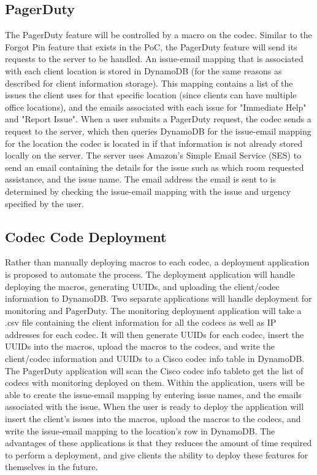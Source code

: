 \documentclass[letterpaper,12pt]{article}
\begin{document}
\subsection{PagerDuty}
The PagerDuty feature will be controlled by a macro on the codec. Similar to the Forgot Pin feature that exists in the PoC, the PagerDuty feature will send its requests to the server to be handled. An issue-email mapping that is associated with each client location is stored in DynamoDB (for the same reasons as described for client information storage). This mapping contains a list of the issues the client uses for that specific location (since clients can have multiple office locations), and the emails associated with each issue for "Immediate Help" and "Report Issue". When a user submits a PagerDuty request, the codec sends a request to the server, which then queries DynamoDB for the issue-email mapping for the location the codec is located in if that information is not already stored locally on the server. The server uses Amazon's Simple Email Service (SES) to send an email containing the details for the issue such as which room requested assistance, and the issue name. The email address the email is sent to is determined by checking the issue-email mapping with the issue and urgency specified by the user.

\subsection{Codec Code Deployment}
Rather than manually deploying macros to each codec, a deployment application is proposed to automate the process. The deployment application will handle deploying the macros, generating UUIDs, and uploading the client/codec information to DynamoDB. Two separate applications will handle deployment for monitoring and PagerDuty. The monitoring deployment application will take a .csv file containing the client information for all the codecs as well as IP addresses for each codec. It will then generate UUIDs for each codec, insert the UUIDs into the macros, upload the macros to the codecs, and write the client/codec information and UUIDs to a Cisco codec info table in DynamoDB. The PagerDuty application will scan the Cisco codec info tableto get the list of codecs with monitoring deployed on them. Within the application, users will be able to create the issue-email mapping by entering issue names, and the emails associated with the issue. When the user is ready to deploy the application will insert the client's issues into the macros, upload the macros to the codecs, and write the issue-email mapping to the location's row in DynamoDB. The advantages of these applications is that they reduces the amount of time required to perform a deployment, and give clients the ability to deploy these features for themselves in the future.
\end{document}

